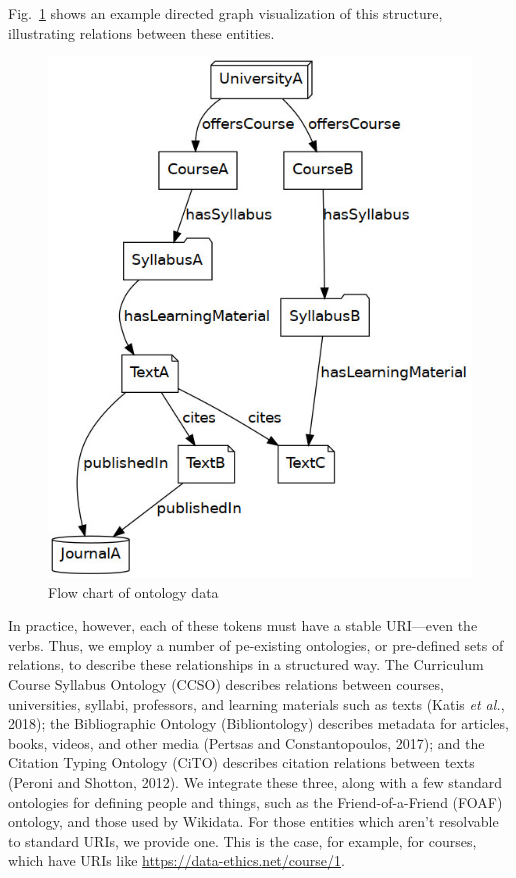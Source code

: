\documentclass[
]{article}
\begin{document}
Fig.~\ref{fig:chart} shows an example directed graph visualization of
this structure, illustrating relations between these entities.

\begin{figure}
\hypertarget{fig:chart}{%
\centering
\includegraphics{chart.jpg}
\caption{Flow chart of ontology data}\label{fig:chart}
}
\end{figure}

In practice, however, each of these tokens must have a stable URI---even
the verbs. Thus, we employ a number of pe-existing ontologies, or
pre-defined sets of relations, to describe these relationships in a
structured way. The Curriculum Course Syllabus Ontology (CCSO) describes
relations between courses, universities, syllabi, professors, and
learning materials such as texts (Katis \emph{et al.}, 2018); the
Bibliographic Ontology (Bibliontology) describes metadata for articles,
books, videos, and other media (Pertsas and Constantopoulos, 2017); and
the Citation Typing Ontology (CiTO) describes citation relations between
texts (Peroni and Shotton, 2012). We integrate these three, along with a
few standard ontologies for defining people and things, such as the
Friend-of-a-Friend (FOAF) ontology, and those used by Wikidata. For
those entities which aren't resolvable to standard URIs, we provide one.
This is the case, for example, for courses, which have URIs like
\url{https://data-ethics.net/course/1}.
\end{document}
